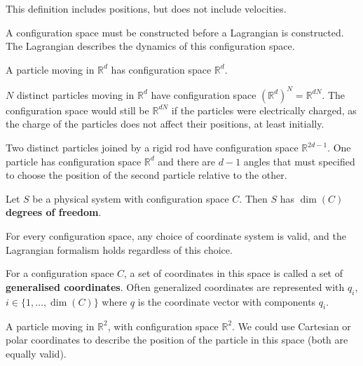 \begin{remark}
	This definition includes positions, but does not include velocities.
\end{remark}

\begin{remark}
	A configuration space must be constructed before a Lagrangian is constructed. The Lagrangian describes the dynamics of this configuration space.
\end{remark}

\begin{example}
	A particle moving in $\mathbb{R}^d$ has configuration space $\mathbb{R}^d$.
\end{example}

\begin{example}
	$N$ distinct particles moving in $\mathbb{R}^d$ have configuration space ${(\mathbb{R}^d)}^N = \mathbb{R}^{dN}$. The configuration space would still be $\mathbb{R}^{dN}$ if the particles were electrically charged, as the charge of the particles does not affect their positions, at least initially.
\end{example}

\begin{example}
	Two distinct particles joined by a rigid rod have configuration space $\mathbb{R}^{2d - 1}$. One particle has configuration space $\mathbb{R}^d$ and there are $d - 1$ angles that must specified to choose the position of the second particle relative to the other.
\end{example}

\begin{definition}
	Let $S$ be a physical system with configuration space $C$. Then $S$ has $\dim(C)$ \textbf{degrees of freedom}.
\end{definition}

\begin{remark}
	For every configuration space, any choice of coordinate system is valid, and the Lagrangian formalism holds regardless of this choice.
\end{remark}

\begin{definition}
	For a configuration space $C$, a set of coordinates in this space is called a set of \textbf{generalised coordinates}. Often generalized coordinates are represented with $q_i$, $i \in \{ 1, \dots, \dim(C) \}$ where $\underline{q}$ is the coordinate vector with components $q_i$.
\end{definition}

\begin{example}
	A particle moving in $\mathbb{R}^2$, with configuration space $\mathbb{R}^2$. We could use Cartesian or polar coordinates to describe the position of the particle in this space (both are equally valid).
\end{example}

